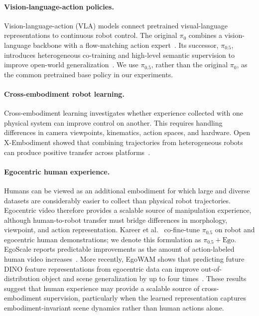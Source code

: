 \documentclass[10pt,conference]{IEEEtran}
\begin{document}
\paragraph{Vision-language-action policies.}
Vision-language-action (VLA) models connect pretrained visual-language
representations to continuous robot control. The original $\pi_0$ combines a
vision-language backbone with a flow-matching action
expert~\cite{black2024pi0}. Its successor, $\pi_{0.5}$, introduces heterogeneous
co-training and high-level semantic supervision to improve open-world
generalization~\cite{black2025pi05}. We use $\pi_{0.5}$, rather than the original
$\pi_0$, as the common pretrained base policy in our experiments.

\paragraph{Cross-embodiment robot learning.}
Cross-embodiment learning investigates whether experience collected with one
physical system can improve control on another. This requires handling
differences in camera viewpoints, kinematics, action spaces, and hardware.
Open X-Embodiment showed that combining trajectories from heterogeneous robots can produce positive transfer across platforms~\cite{openx2023}.

\paragraph{Egocentric human experience.}
Humans can be viewed as an additional embodiment for which large and diverse
datasets are considerably easier to collect than physical robot trajectories.
Egocentric video therefore provides a scalable source of manipulation
experience, although human-to-robot transfer must bridge differences in
morphology, viewpoint, and action representation. Kareer
et al.~\cite{kareer2025humanrobot} co-fine-tune $\pi_{0.5}$ on robot and
egocentric human demonstrations; we denote this formulation as
$\pi_{0.5}+\mathrm{Ego}$. EgoScale reports predictable improvements as the
amount of action-labeled human video increases~\cite{zheng2026egoscale}.
More recently, EgoWAM shows that predicting future DINO feature
representations from egocentric data can improve out-of-distribution object and
scene generalization by up to four times~\cite{li2026egowam}. These results
suggest that human experience may provide a scalable source of
cross-embodiment supervision, particularly when the learned representation
captures embodiment-invariant scene dynamics rather than human actions alone.
\end{document}
